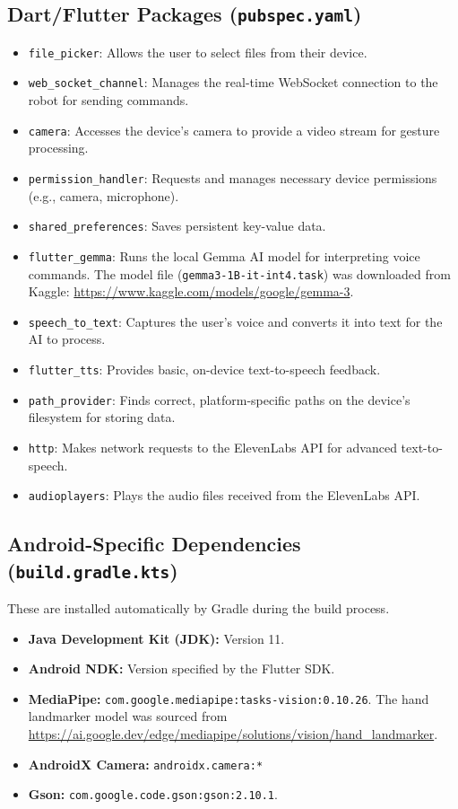 \documentclass[11pt,a4paper]{article}
\begin{document}
\subsection{Dart/Flutter Packages (\texttt{pubspec.yaml})}
\begin{itemize}
    \item \texttt{file\_picker}: Allows the user to select files from their device.
    \item \texttt{web\_socket\_channel}: Manages the real-time WebSocket connection to the robot for sending commands.
    \item \texttt{camera}: Accesses the device's camera to provide a video stream for gesture processing.
    \item \texttt{permission\_handler}: Requests and manages necessary device permissions (e.g., camera, microphone).
    \item \texttt{shared\_preferences}: Saves persistent key-value data.
    \item \texttt{flutter\_gemma}: Runs the local Gemma AI model for interpreting voice commands. The model file (\texttt{gemma3-1B-it-int4.task}) was downloaded from Kaggle: \url{https://www.kaggle.com/models/google/gemma-3}.
    \item \texttt{speech\_to\_text}: Captures the user's voice and converts it into text for the AI to process.
    \item \texttt{flutter\_tts}: Provides basic, on-device text-to-speech feedback.
    \item \texttt{path\_provider}: Finds correct, platform-specific paths on the device's filesystem for storing data.
    \item \texttt{http}: Makes network requests to the ElevenLabs API for advanced text-to-speech.
    \item \texttt{audioplayers}: Plays the audio files received from the ElevenLabs API.
\end{itemize}

\subsection{Android-Specific Dependencies (\texttt{build.gradle.kts})}
These are installed automatically by Gradle during the build process.
\begin{itemize}
    \item \textbf{Java Development Kit (JDK):} Version 11.
    \item \textbf{Android NDK:} Version specified by the Flutter SDK.
    \item \textbf{MediaPipe:} \texttt{com.google.mediapipe:tasks-vision:0.10.26}. The hand landmarker model was sourced from \url{https://ai.google.dev/edge/mediapipe/solutions/vision/hand_landmarker}.
    \item \textbf{AndroidX Camera:} \texttt{androidx.camera:*}
    \item \textbf{Gson:} \texttt{com.google.code.gson:gson:2.10.1}.
\end{itemize}
\end{document}
